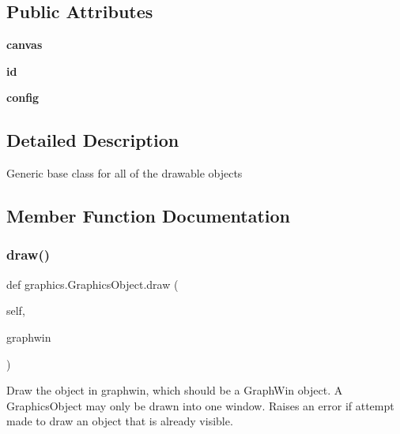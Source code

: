 \subsection*{Public Attributes}
\begin{DoxyCompactItemize}
\item 
\mbox{\label{classgraphics_1_1_graphics_object_a961312a5609642e6d96b892e9b5755e3}} 
{\bfseries canvas}
\item 
\mbox{\label{classgraphics_1_1_graphics_object_a465597cb2472214302bfa13c7708e217}} 
{\bfseries id}
\item 
\mbox{\label{classgraphics_1_1_graphics_object_a329ba44d4b0347a6f62eb4559110540a}} 
{\bfseries config}
\end{DoxyCompactItemize}


\subsection{Detailed Description}
\begin{DoxyVerb}Generic base class for all of the drawable objects\end{DoxyVerb}
 

\subsection{Member Function Documentation}
\mbox{\label{classgraphics_1_1_graphics_object_ac7849154dccab74cb76d2a28035db48c}} 
\subsubsection{\texorpdfstring{draw()}{draw()}}
{\footnotesize\ttfamily def graphics.\+Graphics\+Object.\+draw (\begin{DoxyParamCaption}\item[{}]{self,  }\item[{}]{graphwin }\end{DoxyParamCaption})}

\begin{DoxyVerb}Draw the object in graphwin, which should be a GraphWin
object.  A GraphicsObject may only be drawn into one
window. Raises an error if attempt made to draw an object that
is already visible.\end{DoxyVerb}
 \mbox{\label{classgraphics_1_1_graphics_object_a2dc26fc41e5fa51c7a97b592da2926e8}} 
